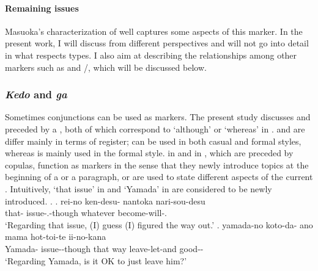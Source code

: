 


\paragraph{Remaining issues}

Masuoka's characterization of  well captures
some aspects of this marker.
In the present work, I will discuss  from different perspectives
and will not go into detail in what respects  types.
I also aim at describing the relationships among other  markers
such as  and /,
which will be discussed below.



\subsubsection{\textit{Kedo} and \textit{ga}}\label{BackSubSubKedo}

Sometimes conjunctions can be used as  markers.
The present study discusses  and  preceded by a ,
both of which correspond to `although' or `whereas' in .
 and  are differ mainly in terms of register;
 can be used in both casual and formal styles,
whereas  is mainly used in the formal style.
 in \Next[a] and  in \Next[b],
which are preceded by copulas,
function as  markers in the sense that
they newly introduce topics at the beginning of a  or a paragraph, or are used to state different aspects of the current 
\cite{koide84,takahashi99}.
Intuitively,
`that issue' in \Next[a] and `Yamada' in \Next[b]
are considered to be newly introduced.
%
\ex.
 \ag. rei-no ken-desu- nantoka nari-sou-desu \\
      that- issue-.-though whatever become-will-. \\
      `Regarding that issue, (I) guess (I) figured the way out.'
 \bg. yamada-no koto-da- ano mama hot-toi-te ii-no-kana \\
      Yamada- issue--though that way leave-let-and good-- \\
      `Regarding Yamada, is it OK to just leave him?'
      \hfill{\cite[283]{niwa06}}


